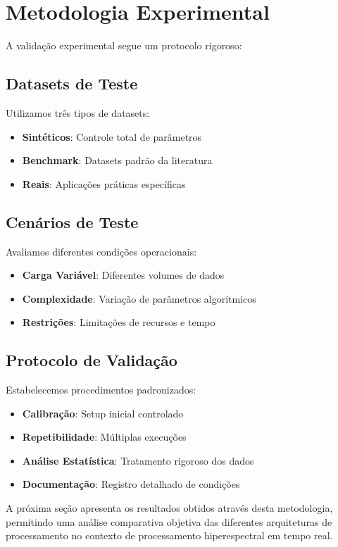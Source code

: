 \section{Metodologia Experimental}\label{sec:metodologia_exp}

A validação experimental segue um protocolo rigoroso:

\subsection{Datasets de Teste}
Utilizamos três tipos de datasets:

\begin{itemize}
    \item \textbf{Sintéticos}: Controle total de parâmetros
    \item \textbf{Benchmark}: Datasets padrão da literatura
    \item \textbf{Reais}: Aplicações práticas específicas
\end{itemize}

\subsection{Cenários de Teste}
Avaliamos diferentes condições operacionais:

\begin{itemize}
    \item \textbf{Carga Variável}: Diferentes volumes de dados
    \item \textbf{Complexidade}: Variação de parâmetros algorítmicos
    \item \textbf{Restrições}: Limitações de recursos e tempo
\end{itemize}

\subsection{Protocolo de Validação}
Estabelecemos procedimentos padronizados:

\begin{itemize}
    \item \textbf{Calibração}: Setup inicial controlado
    \item \textbf{Repetibilidade}: Múltiplas execuções
    \item \textbf{Análise Estatística}: Tratamento rigoroso dos dados
    \item \textbf{Documentação}: Registro detalhado de condições
\end{itemize}

A próxima seção apresenta os resultados obtidos através desta metodologia, permitindo uma análise comparativa objetiva das diferentes arquiteturas de processamento no contexto de processamento hiperespectral em tempo real.
